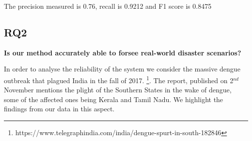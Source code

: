 \documentclass[journal, a4paper]{IEEEtran}
\begin{document}
The precision measured is 0.76, recall is 0.9212 and F1 score is 0.8475

\subsection{RQ2}
\textbf{Is our method accurately able to forsee real-world disaster scenarios? }

In order to analyse the reliability of the system we consider the massive dengue outbreak that plagued India in the fall of 2017. \footnote{https://www.telegraphindia.com/india/dengue-spurt-in-south-182846}. The report, published on 2$^{nd}$ November mentions the plight of the Southern States in the wake of dengue, some of the affected ones being Kerala and Tamil Nadu. We highlight the findings from our data in this aspect.
\end{document}
